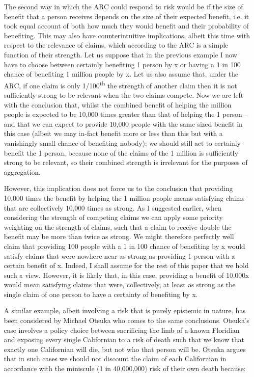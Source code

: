 \documentclass[man,11pt,a4paper]{apa7}
\begin{document}
The second way in which the ARC could respond to risk would be if the size of benefit that a person receives depends on the size of their expected benefit, i.e. it took equal account of both how much they would benefit and their probability of benefiting. This may also have counterintuitive implications, albeit this time with respect to the relevance of claims, which according to the ARC is a simple function of their strength. Let us suppose that in the previous example I now have to choose between certainly benefiting 1 person by x or having a 1 in 100 chance of benefiting 1 million people by x. Let us also assume that, under the ARC, if one claim is only 1/100\textsuperscript{th} the strength of another claim then it is not sufficiently strong to be relevant when the two claims compete. Now we are left with the conclusion that, whilst the combined benefit of helping the million people is expected to be 10,000 times greater than that of helping the 1 person -- and that we can expect to provide 10,000 people with the same sized benefit in this case (albeit we may in-fact benefit more or less than this but with a vanishingly small chance of benefiting nobody); we should still act to certainly benefit the 1 person, because none of the claims of the 1 million is sufficiently strong to be relevant, so their combined strength is irrelevant for the purposes of aggregation.

However, this implication does not force us to the conclusion that providing 10,000 times the benefit by helping the 1 million people means satisfying claims that are collectively 10,000 times as strong. As I suggested earlier, when considering the strength of competing claims we can apply some priority weighting on the strength of claims, such that a claim to receive double the benefit may be more than twice as strong. We might therefore perfectly well claim that providing 100 people with a 1 in 100 chance of benefiting by x would satisfy claims that were nowhere near as strong as providing 1 person with a certain benefit of x. Indeed, I shall assume for the rest of this paper that we hold such a view. However, it is likely that, in this case, providing a benefit of 10,000x would mean satisfying claims that were, collectively, at least as strong as the single claim of one person to have a certainty of benefiting by x.

A similar example, albeit involving a risk that is purely epistemic in nature, has been considered by Michael Otsuka who comes to the same conclusions. Otsuka's case involves a policy choice between sacrificing the limb of a known Floridian and exposing every single Californian to a risk of death such that we know that exactly one Californian will die, but not who that person will be. Otsuka argues that in such cases we should not discount the claim of each Californian in accordance with the miniscule (1 in 40,000,000) risk of their own death because:
\end{document}
